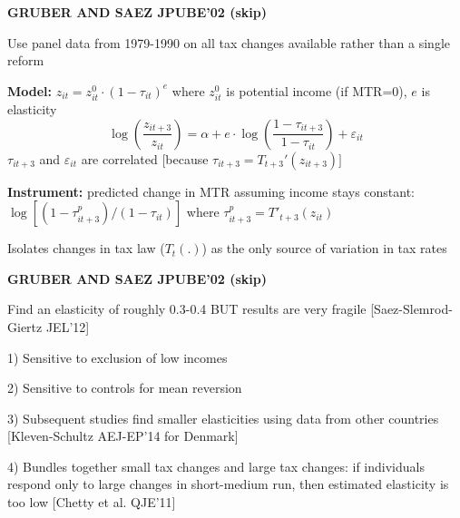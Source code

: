 \documentclass[landscape]{slides}
\begin{document}
%
%
%
%
%

\begin{slide}
\begin{center}
{\bf GRUBER AND SAEZ JPUBE'02 (skip)}
\end{center}

Use panel data from 1979-1990 on all tax changes available rather
than a single reform

{\bf Model:} $z_{it}=z_{it}^0 \cdot (1-\tau_{it})^e$ where
$z^0_{it}$ is potential income (if MTR=0), $e$ is elasticity
$$\log \left ( \frac{z_{i t+3}}{z_{it}} \right ) = \alpha + e \cdot \log \left ( \frac{1-\tau_{i t+3}}{1-\tau_{i
t}} \right ) + \varepsilon_{it}$$ $\tau_{i t+3}$ and $\varepsilon_{it}$ are
correlated [because $\tau_{i t+3} = T_{t+3}'(z_{i t+3})]$

{\bf Instrument:} predicted change in MTR assuming income stays
constant: $\log [(1-\tau^p_{i t+3})/(1-\tau_{i t})]$ where $\tau^p_{i
t+3}=T'_{t+3}(z_{it})$

Isolates changes in tax law ($T_{t}(.)$) as the only source of
variation in tax rates
\end{slide}

\begin{slide}

\end{slide}

\begin{slide}
\begin{center}
{\bf GRUBER AND SAEZ JPUBE'02 (skip)}
\end{center}
Find an elasticity of roughly 0.3-0.4 BUT results are very fragile
[Saez-Slemrod-Giertz JEL'12]

1) Sensitive to exclusion of low incomes 

2) Sensitive to controls for mean reversion

3) Subsequent studies find smaller elasticities using data from
other countries [Kleven-Schultz AEJ-EP'14 for Denmark]

4) Bundles together small tax changes and large tax changes: if
individuals respond only to large changes in short-medium run,
then estimated elasticity is too low [Chetty et al. QJE'11]
\end{slide}
\end{document}
